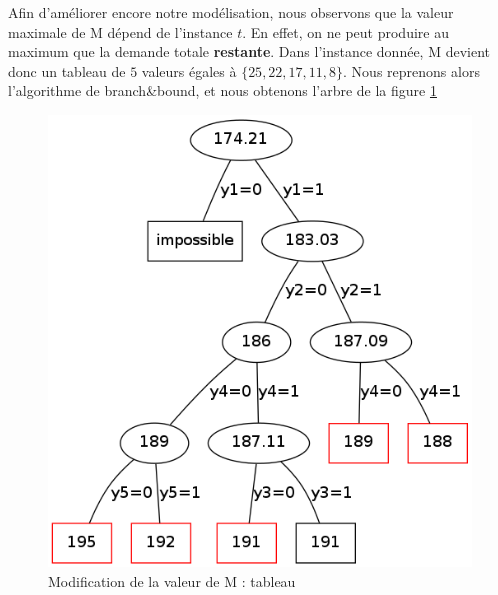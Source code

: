 \documentclass[a4paper,11pt,twoside]{report}
\begin{document}
Afin d'améliorer encore notre modélisation, nous observons que la valeur maximale de M dépend de l'instance $t$. En effet, on ne peut produire au maximum que la demande totale \textbf{restante}.
Dans l'instance donnée, M devient donc un tableau de $5$ valeurs égales à $\{25, 22, 17, 11, 8\}$. Nous reprenons alors l'algorithme de branch\&bound, et nous obtenons l'arbre de la figure \ref{graph2}\\
\begin{figure}[h]
 \centering
 \includegraphics[width=\textwidth/2]{graph2.png}
 \caption{Modification de la valeur de M : tableau}
 \label{graph2}
\end{figure}
\end{document}
